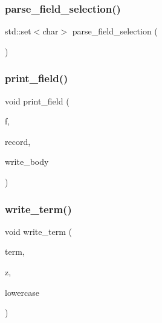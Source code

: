 \mbox{\label{irk-warc_8cpp_a540445d56c199741b8ec16c28c40f5e0}} 
\subsubsection{\texorpdfstring{parse\+\_\+field\+\_\+selection()}{parse\_field\_selection()}}
{\footnotesize\ttfamily std\+::set$<$char$>$ parse\+\_\+field\+\_\+selection (\begin{DoxyParamCaption}{ }\end{DoxyParamCaption})}

\mbox{\label{irk-warc_8cpp_aeaa9afcbcca6c9cac8dfed13f3ec5b3d}} 
\subsubsection{\texorpdfstring{print\+\_\+field()}{print\_field()}}
{\footnotesize\ttfamily void print\+\_\+field (\begin{DoxyParamCaption}\item[{char}]{f,  }\item[{const \mbox{\hyperlink{classirkit_1_1io_1_1warc__record}{irkit\+::io\+::warc\+\_\+record}} \&}]{record,  }\item[{\mbox{\hyperlink{structbody__writer}{body\+\_\+writer}}}]{write\+\_\+body }\end{DoxyParamCaption})}

\mbox{\label{irk-warc_8cpp_af7d34b3e12bc004e9cc0041e2053ac42}} 
\subsubsection{\texorpdfstring{write\+\_\+term()}{write\_term()}}
{\footnotesize\ttfamily void write\+\_\+term (\begin{DoxyParamCaption}\item[{std\+::string \&\&}]{term,  }\item[{\mbox{\hyperlink{structirk_1_1porter2_1_1SN__env}{irk\+::porter2\+::\+S\+N\+\_\+env}} $\ast$}]{z,  }\item[{bool}]{lowercase }\end{DoxyParamCaption})}

